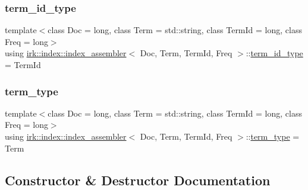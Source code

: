 \mbox{\label{classirk_1_1index_1_1index__assembler_ad632345d29f93e9f10fbc7e91db41f77}} 
\subsubsection{\texorpdfstring{term\+\_\+id\+\_\+type}{term\_id\_type}}
{\footnotesize\ttfamily template$<$class Doc  = long, class Term  = std\+::string, class Term\+Id  = long, class Freq  = long$>$ \\
using \mbox{\hyperlink{classirk_1_1index_1_1index__assembler}{irk\+::index\+::index\+\_\+assembler}}$<$ Doc, Term, Term\+Id, Freq $>$\+::\mbox{\hyperlink{classirk_1_1index_1_1index__assembler_ad632345d29f93e9f10fbc7e91db41f77}{term\+\_\+id\+\_\+type}} =  Term\+Id}

\mbox{\label{classirk_1_1index_1_1index__assembler_a1dec315f145c0e887e0035c3b7f23235}} 
\subsubsection{\texorpdfstring{term\+\_\+type}{term\_type}}
{\footnotesize\ttfamily template$<$class Doc  = long, class Term  = std\+::string, class Term\+Id  = long, class Freq  = long$>$ \\
using \mbox{\hyperlink{classirk_1_1index_1_1index__assembler}{irk\+::index\+::index\+\_\+assembler}}$<$ Doc, Term, Term\+Id, Freq $>$\+::\mbox{\hyperlink{classirk_1_1index_1_1index__assembler_a1dec315f145c0e887e0035c3b7f23235}{term\+\_\+type}} =  Term}



\subsection{Constructor \& Destructor Documentation}
\mbox{\label{classirk_1_1index_1_1index__assembler_aaf0390e58f47335b54a86c8bfe79cec2}} 
